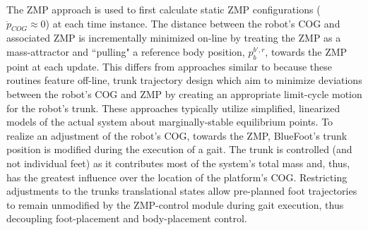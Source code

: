 		The ZMP approach is used to first calculate static ZMP configurations ( \IE $\ddot{p}_{COG}\approx0$) at each time instance. The distance between the robot's COG and associated ZMP is incrementally minimized on-line by treating the ZMP as a  mass-attractor and ``pulling" a reference body position, ${p}_{b}^{b',r}$, towards the ZMP point at each update. This differs from approaches similar to \cite{Kurazume2003} because these routines feature off-line, trunk trajectory design which aim to minimize deviations between the robot's COG and ZMP by creating an appropriate limit-cycle motion for the robot's trunk. These approaches typically utilize simplified, linearized models of the actual system about marginally-stable equilibrium points. To realize an adjustment of the robot's COG, towards the ZMP, BlueFoot's trunk position is modified during the execution of a gait. The trunk is controlled (and not individual feet) as it contributes most of the system's total mass and, thus, has the greatest influence over the location of the platform's COG. Restricting adjustments to the trunks translational states allow pre-planned foot trajectories to remain unmodified by the ZMP-control module during gait execution, thus decoupling foot-placement and body-placement control.


